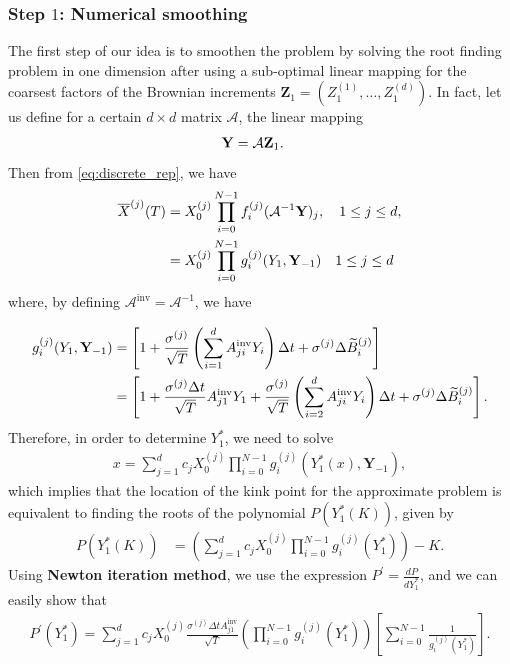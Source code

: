 \subsubsection{Step $1$: Numerical smoothing}\label{sec:Step $1$: Numerical smoothing}
The first step of our idea is to smoothen the problem by solving the root finding problem in one dimension after using a sub-optimal linear mapping for the coarsest factors of the Brownian increments $\mathbf{Z}_1=(Z^{(1)}_1 , \dots, Z^{(d)}_1)$. In fact, let us define for a certain $d \times d $ matrix $\mathcal{A} $, the linear mapping 
\begin{align}\label{eq:linear_transformation}
\mathbf{Y}&=\mathcal{A} \mathbf{Z}_1 .
\end{align}
Then from \eqref{eq:discrete_rep}, we have
 \begin{align}\label{eq:discrete_rep_2}
	\overline{X}^{(j)}(T)&= X_0^{(j)} \prod_{i=0}^{N-1} f_i^{(j)}(\mathcal{A}^{-1} \mathbf{Y})_{j} , \quad 1 \le j \le d , \nonumber \\
&=X_0^{(j)} \prod_{i=0}^{N-1} g_i^{(j)}(Y_{1},\mathbf{Y}_{-1}) \quad 1 \le j \le d 
\end{align}
where, by defining $\mathcal{A}^{\text{inv}}= \mathcal{A}^{-1}$, we have

\begin{align}\label{eq: incremental functions}
g_i^{(j)}(Y_1,\mathbf{Y}_{-1})&=  \left[ 1+\frac{\sigma^{(j)}}{\sqrt{T}} \left( \sum_{i=1}^d A^{\text{inv}}_{ji} Y_i \right) \Delta t+ \sigma^{(j)} \Delta \widetilde{B}^{(j)}_{i}\right] \nonumber\\
&=  \left[ 1+\frac{\sigma^{(j)} \Delta t}{\sqrt{T}} A^{\text{inv}}_{j1} Y_1 +\frac{\sigma^{(j)}}{\sqrt{T}} \left( \sum_{i=2}^d A^{\text{inv}}_{ji} Y_i  \right) \Delta t+ \sigma^{(j)} \Delta \widetilde{B}^{(j)}_{i}\right] .
\end{align}
Therefore, in order to determine $Y^{\ast}_1$, we need to solve
\begin{align}
	x=\sum_{j=1}^{d} c_j X_0^{(j)}  \prod_{i=0}^{N-1} g_i^{(j)}(Y^{\ast}_1(x),\mathbf{Y}_{-1} ),
\end{align}
which implies that the location of the kink point for the approximate problem is equivalent to finding the roots of the polynomial $P(Y^\ast_1(K))$, given by
\begin{align}\label{polynomial_kink_location_basket}
	P(Y^\ast_1(K))&=\left(\sum_{j=1}^{d} c_j X_0^{(j)}  \prod_{i=0}^{N-1}  g_i^{(j)}(Y^{\ast}_1) \right) -K.
\end{align}
Using  \textbf{Newton iteration method}, we use the expression $P^\prime=\frac{d P}{d Y^\ast_1}$, and we can easily show that
\begin{align}\label{polynomial_kink_location_derivative_basket}
	P^\prime(Y^\ast_1)=\sum_{j=1}^{d} c_j X_0^{(j)}  \frac{\sigma^{(j)} \Delta t A^{\text{inv}}_{j1}} {\sqrt{T}} \left( \prod_{i=0}^{N-1} g_i^{(j)}(Y^\ast_1) \right) \left[ \sum_{i=0}^{N-1} \frac{1}{g_i^{(j)}(Y^\ast_1)}\right].
\end{align}



